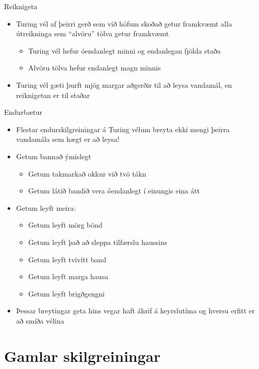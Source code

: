 \documentclass[handout]{beamer}
\begin{document}
\begin{frame}{Reiknigeta}
\begin{itemize}
 \item Turing vél af þeirri gerð sem við höfum skoðað getur framkvæmt alla útreikninga sem ``alvöru'' tölva getur framkvæmt
 \begin{itemize}
  \item Turing vél hefur óendanlegt minni og endanlegan fjölda staða
  \item Alvöru tölva hefur endanlegt magn minnis
 \end{itemize}
 \item Turing vél gæti þurft mjög margar aðgerðir til að leysa vandamál, en reiknigetan er til staðar
\end{itemize}
\end{frame}

\begin{frame}{Endurbætur}
\begin{itemize}
 \item Flestar endurskilgreiningar á Turing vélum breyta ekki mengi þeirra vandamála sem hægt er að leysa!
 \item Getum bannað ýmislegt
 \begin{itemize}
  \item Getum takmarkað okkur við tvö tákn
  \item Getum látið bandið vera óendanlegt í einungis eina átt
 \end{itemize}
 \item Getum leyft meira:
 \begin{itemize}
  \item Getum leyft mörg bönd
  \item Getum leyft það að sleppa tilfærslu haussins
  \item Getum leyft tvívítt band
  \item Getum leyft marga hausa
  \item Getum leyft brigðgengni
 \end{itemize}
 \item Þessar breytingar geta hins vegar haft áhrif á keyrslutíma og hversu erfitt er að smíða vélina
\end{itemize}
\end{frame}

\section{Gamlar skilgreiningar}
\end{document}
